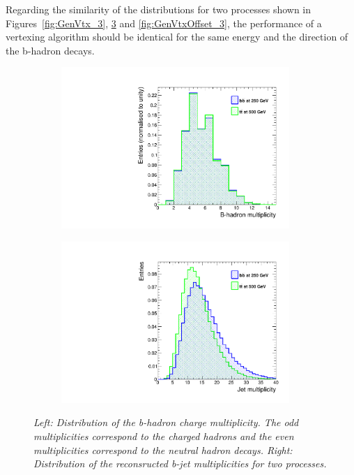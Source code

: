Regarding the similarity of the distributions for two processes shown in Figures~\ref{fig:GenVtx_3}, \ref{fig:GenHadronParams_3} and \ref{fig:GenVtxOffset_3}, the performance of a vertexing algorithm should be identical for the same energy and the direction of the b-hadron decays.


\begin{figure}
\centering
\begin{subfigure}{0.5\textwidth}
    \includegraphics[width=0.95\textwidth]{ILD/plots/gen-hadron-multiplicity.pdf}
\caption{\label{fig:GenHadronParams_a_3} }
\end{subfigure}%
  \begin{subfigure}{0.5\textwidth}
\centering
    \includegraphics[width=0.95\textwidth]{ILD/plots/jet-multi.pdf}
\caption{\label{fig:GenHadronParams_b_3} }
\end{subfigure}
    \caption{\sl Left: Distribution of the b-hadron charge multiplicity. The odd multiplicities correspond to the charged hadrons and the even multiplicities correspond to the neutral hadron decays. Right: Distribution of the reconsructed b-jet multiplicities for two processes. }
    \label{fig:GenHadronParams_3}
\end{figure}



